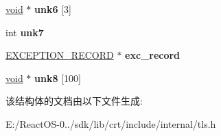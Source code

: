 \begin{DoxyCompactItemize}
\hyperlink{interfacevoid}{void} $\ast$ {\bfseries unk6} \mbox{[}3\mbox{]}
\item 
\mbox{\label{struct____thread__data_a4815fbcf18ea83d5d3344bb4ba272a86}} 
int {\bfseries unk7}
\item 
\mbox{\label{struct____thread__data_ae806cc60c2bb22211e5f5c4255051510}} 
\hyperlink{struct___e_x_c_e_p_t_i_o_n___r_e_c_o_r_d}{E\+X\+C\+E\+P\+T\+I\+O\+N\+\_\+\+R\+E\+C\+O\+RD} $\ast$ {\bfseries exc\+\_\+record}
\item 
\mbox{\label{struct____thread__data_ab9a6fc4a22afa45bd93fca59ef331e97}} 
\hyperlink{interfacevoid}{void} $\ast$ {\bfseries unk8} \mbox{[}100\mbox{]}
\end{DoxyCompactItemize}


该结构体的文档由以下文件生成\+:\begin{DoxyCompactItemize}
\item 
E\+:/\+React\+O\+S-\/0../sdk/lib/crt/include/internal/tls.\+h\end{DoxyCompactItemize}
